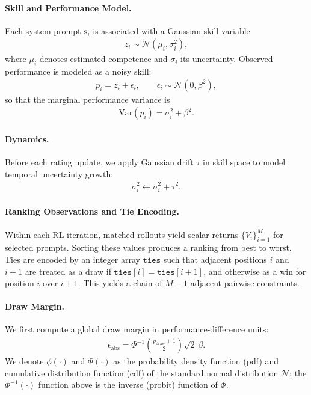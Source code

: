 \documentclass{article}
\theoremstyle{plain}
\theoremstyle{definition}
\theoremstyle{remark}
\begin{document}
\paragraph{Skill and Performance Model.}
Each system prompt $\mathbf{s}_i$ is associated with a Gaussian skill variable
\begin{align*}
z_i \sim \mathcal{N}(\mu_i,\sigma_i^2),
\end{align*}
where $\mu_i$ denotes estimated competence and $\sigma_i$ its uncertainty. Observed performance is modeled as a noisy skill:
\begin{align*}
p_i = z_i + \epsilon_i, \qquad \epsilon_i \sim \mathcal{N}(0,\beta^2),
\end{align*}
so that the marginal performance variance is
\begin{align*}
\mathrm{Var}(p_i)=\sigma_i^2+\beta^2.
\end{align*}

\paragraph{Dynamics.}
Before each rating update, we apply Gaussian drift $\tau$ in skill space to model temporal uncertainty growth:
\begin{align*}
\sigma_i^2 \leftarrow \sigma_i^2 + \tau^2 .
\end{align*}

\paragraph{Ranking Observations and Tie Encoding.}
Within each RL iteration, matched rollouts yield scalar returns $\{V_i\}_{i=1}^{M}$ for selected prompts. Sorting these values produces a ranking from best to worst. Ties are encoded by an integer array $\texttt{ties}$ such that adjacent positions $i$ and $i+1$ are treated as a draw if $\texttt{ties}[i]=\texttt{ties}[i+1]$, and otherwise as a win for position $i$ over $i+1$. This yields a chain of $M-1$ adjacent pairwise constraints.

\paragraph{Draw Margin.}
We first compute a global draw margin in performance-difference units:
\begin{align*}
\epsilon_{\mathrm{abs}}
= \Phi^{-1}\!\left(\frac{p_{\text{draw}}+1}{2}\right)\sqrt{2}\,\beta .
\end{align*}
We denote $\phi(\cdot)$ and $\Phi(\cdot)$ as the probability density function (pdf) and cumulative distribution function (cdf) of the standard normal distribution $\mathcal{N}$; the $\Phi^{-1}(\cdot)$ function above is the inverse (probit) function of $\Phi$.
\end{document}
